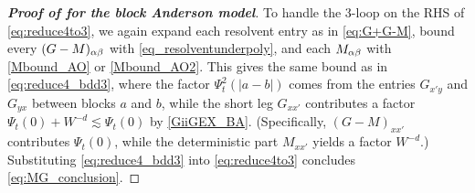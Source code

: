 \begin{proof}[\bf Proof of  for the block Anderson model]
To handle the 3-loop on the RHS of \eqref{eq:reduce4to3}, we again expand each resolvent entry as in \eqref{eq:G+G-M}, bound every $(G-M)_{\alpha\beta}$ with \eqref{eq_resolventunderpoly}, and each $M_{\alpha \beta}$ with \eqref{Mbound_AO} or \eqref{Mbound_AO2}. This gives the same bound as in \eqref{eq:reduce4_bdd3}, 
where the factor $ \Psi_t^2(|a-b|)$ comes from the entries $G_{x'y}$ and $G_{yx}$ between blocks $a$ and $b$, while the short leg $G_{xx'}$ contributes a factor $\Psi_t(0)+W^{-d}\lesssim\Psi_t(0)$ by \eqref{GiiGEX_BA}. (Specifically, $(G-M)_{xx'}$ contributes $\Psi_t(0)$, while the deterministic part $M_{xx'}$ yields a factor $W^{-d}$.) %
Substituting \eqref{eq:reduce4_bdd3} into \eqref{eq:reduce4to3} concludes  \eqref{eq:MG_conclusion}.


\end{proof}
